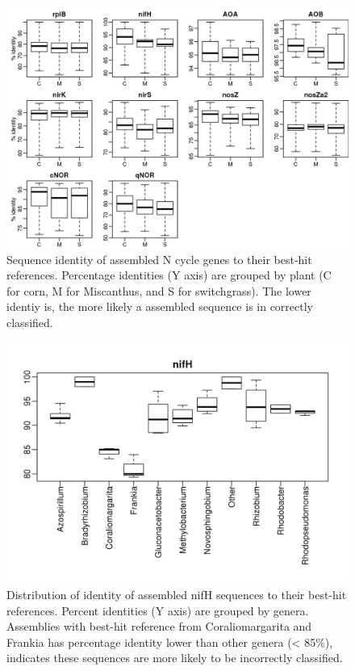 \documentclass[]{msu-thesis}
\begin{document}
\begin{figure}[tbph!]
  \centering
  \includegraphics[scale=1]{figs/chap4-xander-ncycle-similarity}
  \caption[Identity of assembled N cycle genes to their best-hit references]{Sequence identity of assembled N cycle genes to their best-hit references. Percentage identities (Y axis) are grouped by plant (C for corn, M for Miscanthus, and S for switchgrass). The lower identiy is, the more likely a assembled sequence is in correctly classified.}
  \label{fig:chap4FigS9}
\end{figure}


\begin{figure}[tbph!]
  \centering
  \includegraphics[scale=1]{figs/chap4-xander-nifH-genus-similarity}
  \caption[Identity of assembled nifH sequences to their best-hit references]{Distribution of identity of assembled nifH sequences to their best-hit references. Percent identities (Y axis) are grouped by genera. Assemblies with best-hit reference from Coraliomargarita and Frankia has percentage identity lower than other genera (< 85\%), indicates these sequences are more likely to be incorrectly classified.}
  \label{fig:chap4FigS10}
\end{figure}
\end{document}

